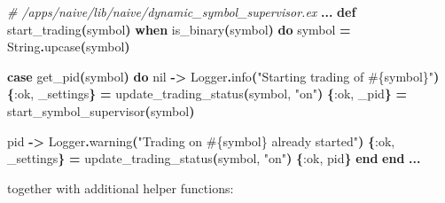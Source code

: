 \documentclass[
  oneside]{book}
\newenvironment{Shaded}{\begin{snugshade}}{\end{snugshade}}
\newcommand{\CommentTok}[1]{\textcolor[rgb]{0.56,0.35,0.01}{\textit{#1}}}
\newcommand{\ConstantTok}[1]{\textcolor[rgb]{0.56,0.35,0.01}{#1}}
\newcommand{\FunctionTok}[1]{\textcolor[rgb]{0.13,0.29,0.53}{\textbf{#1}}}
\newcommand{\KeywordTok}[1]{\textcolor[rgb]{0.13,0.29,0.53}{\textbf{#1}}}
\newcommand{\NormalTok}[1]{#1}
\newcommand{\OperatorTok}[1]{\textcolor[rgb]{0.81,0.36,0.00}{\textbf{#1}}}
\newcommand{\OtherTok}[1]{\textcolor[rgb]{0.56,0.35,0.01}{#1}}
\newcommand{\StringTok}[1]{\textcolor[rgb]{0.31,0.60,0.02}{#1}}
\newcommand{\VariableTok}[1]{\textcolor[rgb]{0.00,0.00,0.00}{#1}}
\begin{document}
\begin{Shaded}
\begin{Highlighting}[]
\CommentTok{\# /apps/naive/lib/naive/dynamic\_symbol\_supervisor.ex}
  \OperatorTok{...}
  \KeywordTok{def}\NormalTok{ start\_trading}\FunctionTok{(}\NormalTok{symbol}\FunctionTok{)} \KeywordTok{when}\NormalTok{ is\_binary}\FunctionTok{(}\NormalTok{symbol}\FunctionTok{)} \KeywordTok{do}
\NormalTok{    symbol }\OperatorTok{=} \ConstantTok{String}\OperatorTok{.}\NormalTok{upcase}\FunctionTok{(}\NormalTok{symbol}\FunctionTok{)}
    
    \KeywordTok{case}\NormalTok{ get\_pid}\FunctionTok{(}\NormalTok{symbol}\FunctionTok{)} \KeywordTok{do}
      \ConstantTok{nil} \OperatorTok{{-}\textgreater{}}
        \ConstantTok{Logger}\OperatorTok{.}\NormalTok{info}\FunctionTok{(}\StringTok{"Starting trading of }\OtherTok{\#\{}\NormalTok{symbol}\OtherTok{\}}\StringTok{"}\FunctionTok{)}
        \FunctionTok{\{}\VariableTok{:ok}\NormalTok{, \_settings}\FunctionTok{\}} \OperatorTok{=}\NormalTok{ update\_trading\_status}\FunctionTok{(}\NormalTok{symbol, }\StringTok{"on"}\FunctionTok{)}
        \FunctionTok{\{}\VariableTok{:ok}\NormalTok{, \_pid}\FunctionTok{\}} \OperatorTok{=}\NormalTok{ start\_symbol\_supervisor}\FunctionTok{(}\NormalTok{symbol}\FunctionTok{)}

\NormalTok{      pid }\OperatorTok{{-}\textgreater{}}
        \ConstantTok{Logger}\OperatorTok{.}\NormalTok{warning}\FunctionTok{(}\StringTok{"Trading on }\OtherTok{\#\{}\NormalTok{symbol}\OtherTok{\}}\StringTok{ already started"}\FunctionTok{)}
        \FunctionTok{\{}\VariableTok{:ok}\NormalTok{, \_settings}\FunctionTok{\}} \OperatorTok{=}\NormalTok{ update\_trading\_status}\FunctionTok{(}\NormalTok{symbol, }\StringTok{"on"}\FunctionTok{)}
        \FunctionTok{\{}\VariableTok{:ok}\NormalTok{, pid}\FunctionTok{\}}
    \KeywordTok{end}
  \KeywordTok{end}
  \OperatorTok{...}
\end{Highlighting}
\end{Shaded}

\newpage

together with additional helper functions:
\end{document}
